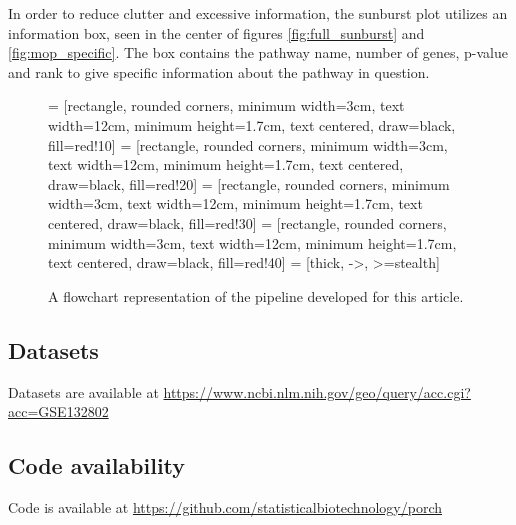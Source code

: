 \documentclass[11pt]{article}
\begin{document}
  In order to reduce clutter and excessive information, the sunburst plot utilizes an information box, seen in the center of figures \ref{fig:full_sunburst} and \ref{fig:mop_specific}. The box contains the pathway name, number of genes, p-value and rank to give specific information about the pathway in question.

  \begin{figure}[t]
    \centering
     = [rectangle, rounded corners, minimum width=3cm, text width=12cm, minimum height=1.7cm, text centered, draw=black, fill=red!10]
     = [rectangle, rounded corners, minimum width=3cm, text width=12cm, minimum height=1.7cm, text centered, draw=black, fill=red!20]
     = [rectangle, rounded corners, minimum width=3cm, text width=12cm, minimum height=1.7cm, text centered, draw=black, fill=red!30]
     = [rectangle, rounded corners, minimum width=3cm, text width=12cm, minimum height=1.7cm, text centered, draw=black, fill=red!40]
     = [thick, ->, >=stealth]

  \caption{ A flowchart representation of the pipeline developed for this article.}
  \label{Pipeline flowchart}
\end{figure}

\subsection*{Datasets}
  Datasets are available at \url{https://www.ncbi.nlm.nih.gov/geo/query/acc.cgi?acc=GSE132802}
\subsection*{Code availability}
  Code is available at \url{https://github.com/statisticalbiotechnology/porch}
\end{document}
